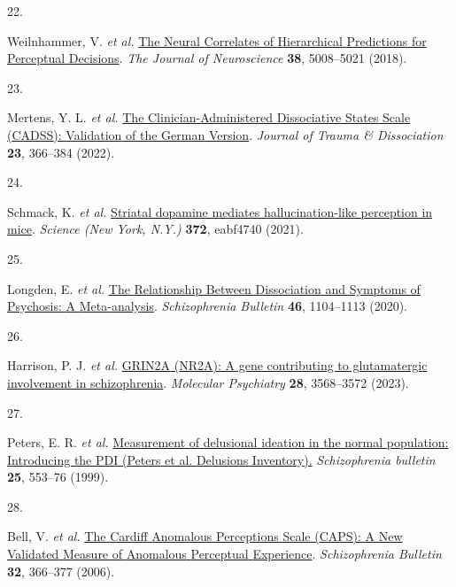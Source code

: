 \documentclass[
]{article}
\newlength{\cslhangindent}
\newlength{\csllabelwidth}
\newlength{\cslentryspacingunit} %
\newenvironment{CSLReferences}[2] %
 {%
  \setlength{\parindent}{0pt}
  \ifodd #1
  \let\oldpar\par
  \def\par{\hangindent=\cslhangindent\oldpar}
  \fi
  \setlength{\parskip}{#2\cslentryspacingunit}
 }%
 {}
\newcommand{\CSLLeftMargin}[1]{\parbox[t]{\csllabelwidth}{#1}}
\newcommand{\CSLRightInline}[1]{\parbox[t]{\linewidth - \csllabelwidth}{#1}\break}
\begin{document}
\begin{CSLReferences}{0}{0}
\leavevmode{}%
\CSLLeftMargin{22. }%
\CSLRightInline{Weilnhammer, V. \emph{et al.}
\href{https://doi.org/10.1523/JNEUROSCI.2901-17.2018}{The {Neural}
{Correlates} of {Hierarchical} {Predictions} for {Perceptual}
{Decisions}}. \emph{The Journal of Neuroscience} \textbf{38}, 5008--5021
(2018).}

\leavevmode{}%
\CSLLeftMargin{23. }%
\CSLRightInline{Mertens, Y. L. \emph{et al.}
\href{https://doi.org/10.1080/15299732.2021.1989111}{The
{Clinician}-{Administered} {Dissociative} {States} {Scale} ({CADSS}):
{Validation} of the {German} {Version}}. \emph{Journal of Trauma \&
Dissociation} \textbf{23}, 366--384 (2022).}

\leavevmode{}%
\CSLLeftMargin{24. }%
\CSLRightInline{Schmack, K. \emph{et al.}
\href{https://doi.org/10.1126/science.abf4740}{Striatal dopamine
mediates hallucination-like perception in mice}. \emph{Science (New
York, N.Y.)} \textbf{372}, eabf4740 (2021).}

\leavevmode{}%
\CSLLeftMargin{25. }%
\CSLRightInline{Longden, E. \emph{et al.}
\href{https://doi.org/10.1093/schbul/sbaa037}{The {Relationship}
{Between} {Dissociation} and {Symptoms} of {Psychosis}: {A}
{Meta}-analysis}. \emph{Schizophrenia Bulletin} \textbf{46}, 1104--1113
(2020).}

\leavevmode{}%
\CSLLeftMargin{26. }%
\CSLRightInline{Harrison, P. J. \emph{et al.}
\href{https://doi.org/10.1038/s41380-023-02265-y}{{GRIN2A} ({NR2A}): A
gene contributing to glutamatergic involvement in schizophrenia}.
\emph{Molecular Psychiatry} \textbf{28}, 3568--3572 (2023).}

\leavevmode{}%
\CSLLeftMargin{27. }%
\CSLRightInline{Peters, E. R. \emph{et al.}
\href{https://www.ncbi.nlm.nih.gov/pubmed/10478789}{Measurement of
delusional ideation in the normal population: Introducing the {PDI}
({Peters} et al. {Delusions} {Inventory}).} \emph{Schizophrenia
bulletin} \textbf{25}, 553--76 (1999).}

\leavevmode{}%
\CSLLeftMargin{28. }%
\CSLRightInline{Bell, V. \emph{et al.}
\href{https://doi.org/10.1093/schbul/sbj014}{The {Cardiff} {Anomalous}
{Perceptions} {Scale} ({CAPS}): {A} {New} {Validated} {Measure} of
{Anomalous} {Perceptual} {Experience}}. \emph{Schizophrenia Bulletin}
\textbf{32}, 366--377 (2006).}


\end{CSLReferences}
\end{document}
